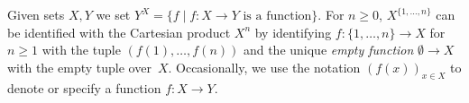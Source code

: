 \label{def:BraisedA} 
Given sets $X, Y$
we set $Y^X = \{ f \mid \text{$f \colon X \to Y$ is a function} \}$.
For $n \ge 0$, $X^{\{1,\ldots,n\}}$
can be identified with the Cartesian product $X^n$
by identifying $f \colon \{1,\ldots,n\} \to X$ for $n \ge 1$ with the tuple $(f(1), \ldots, f(n))$
and the unique \emph{empty function} $\emptyset \to X$ with the empty tuple over~$X$.
Occasionally, we use the notation $(f(x))_{x \in X}$
to denote or specify a function $f \colon X \to Y$.

